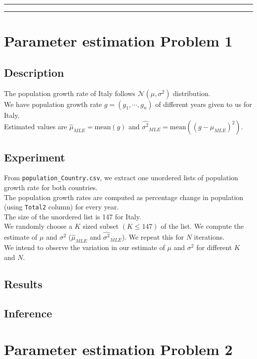 \documentclass[fleqn, 11pt]{article}
\newcommand{\myline}{
    \par
    \kern3pt %
    \hrule height 0.5pt
    \kern2pt %
    \hrule height 0.5pt
    \kern3pt %
    \par
}
\begin{document}
\vspace{7pt}

\myline

\newpage
\section{Parameter estimation Problem 1}
\subsection{Description}

The population growth rate of Italy follows $\mathcal{N}(\mu, \sigma^2)$ distribution. \\
We have population growth rate $g = (g_1, \cdots ,g_n)$ of different years given to us for Italy. \\
Estimated values are $\hat{\mu}_{MLE} = \mathrm{mean}(g)$ and $\hat{\sigma^2}_{MLE} = \mathrm{mean}((g - \hat{\mu}_{MLE})^2)$.

\subsection{Experiment}
From \verb!population_Country.csv!, we extract one unordered lists of population growth rate for both countries. \\
The population growth rates are computed as percentage change in population (using \verb!Total2! column) for every year. \\
The size of the unordered list is 147 for Italy. \\
We randomly choose a $K$ sized subset $(K \le 147)$ of the list. We compute the estimate of $\mu$ and $\sigma^2$ ($\hat{\mu}_{MLE}$ and $\hat{\sigma^2}_{MLE}$). We repeat this for $N$ iterations. \\
We intend to observe the variation in our estimate of $\mu$ and $\sigma^2$ for different $K$ and $N$.


\subsection{Results}


\subsection{Inference}


\newpage
\section{Parameter estimation Problem 2}
\end{document}
